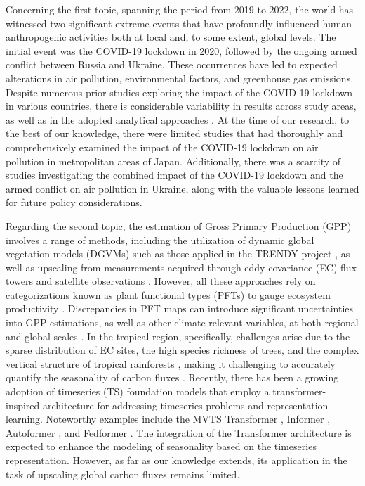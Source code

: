 Concerning the first topic, spanning the period from 2019 to 2022, the world has witnessed two significant extreme events that have profoundly influenced human anthropogenic activities both at local and, to some extent, global levels. The initial event was the COVID-19 lockdown in 2020, followed by the ongoing armed conflict between Russia and Ukraine. These occurrences have led to expected alterations in air pollution, environmental factors, and greenhouse gas emissions. Despite numerous prior studies exploring the impact of the COVID-19 lockdown in various countries, there is considerable variability in results across study areas, as well as in the adopted analytical approaches \citep{shi2021abrupt}. At the time of our research, to the best of our knowledge, there were limited studies that had thoroughly and comprehensively examined the impact of the COVID-19 lockdown on air pollution in metropolitan areas of Japan. Additionally, there was a scarcity of studies investigating the combined impact of the COVID-19 lockdown and the armed conflict on air pollution in Ukraine, along with the valuable lessons learned for future policy considerations.\par

Regarding the second topic, the estimation of Gross Primary Production (GPP) involves a range of methods, including the utilization of dynamic global vegetation models (DGVMs) such as those applied in the TRENDY project \citep{sitch2015recent, le2018global}, as well as upscaling from measurements acquired through eddy covariance (EC) flux towers and satellite observations \citep{jung2019fluxcom, zeng2020global}. However, all these approaches rely on categorizations known as plant functional types (PFTs) to gauge ecosystem productivity \citep{poulter2011plant, poulter2015plant, lin2021improved, guo2023estimating, yan2023integrating}. Discrepancies in PFT maps can introduce significant uncertainties into GPP estimations, as well as other climate-relevant variables, at both regional and global scales \citep{poulter2011plant}. In the tropical region, specifically, challenges arise due to the sparse distribution of EC sites, the high species richness of trees, and the complex vertical structure of tropical rainforests \citep{montgomery2001forest}, making it challenging to accurately quantify the seasonality of carbon fluxes \citep{xu2015satellite}. Recently, there has been a growing adoption of timeseries (TS) foundation models that employ a transformer-inspired architecture for addressing timeseries problems and representation learning. Noteworthy examples include the MVTS Transformer \citep{zerveas2021transformer}, Informer \citep{zhou2021informer}, Autoformer \citep{wu2021autoformer}, and Fedformer \citep{zhou2022fedformer}. The integration of the Transformer architecture is expected to enhance the modeling of seasonality based on the timeseries representation. However, as far as our knowledge extends, its application in the task of upscaling global carbon fluxes remains limited. \par

